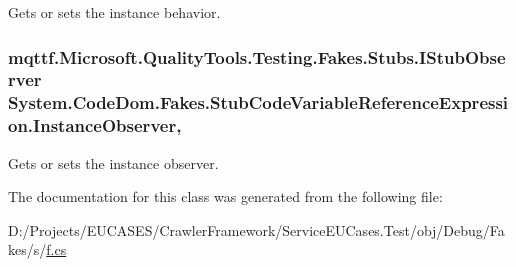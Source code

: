 Gets or sets the instance behavior.

\hypertarget{class_system_1_1_code_dom_1_1_fakes_1_1_stub_code_variable_reference_expression_a4fdfc6a67bf10d71ba61a3eac29d72f8}{
\subsubsection[{Instance\-Observer}]{\setlength{\rightskip}{0pt plus 5cm}mqttf.\-Microsoft.\-Quality\-Tools.\-Testing.\-Fakes.\-Stubs.\-I\-Stub\-Observer System.\-Code\-Dom.\-Fakes.\-Stub\-Code\-Variable\-Reference\-Expression.\-Instance\-Observer\hspace{0.3cm}{\ttfamily [get]}, {\ttfamily [set]}}}\label{class_system_1_1_code_dom_1_1_fakes_1_1_stub_code_variable_reference_expression_a4fdfc6a67bf10d71ba61a3eac29d72f8}


Gets or sets the instance observer.



The documentation for this class was generated from the following file\-:\begin{DoxyCompactItemize}
\item 
D\-:/\-Projects/\-E\-U\-C\-A\-S\-E\-S/\-Crawler\-Framework/\-Service\-E\-U\-Cases.\-Test/obj/\-Debug/\-Fakes/s/\hyperlink{s_2f_8cs}{f.\-cs}\end{DoxyCompactItemize}
